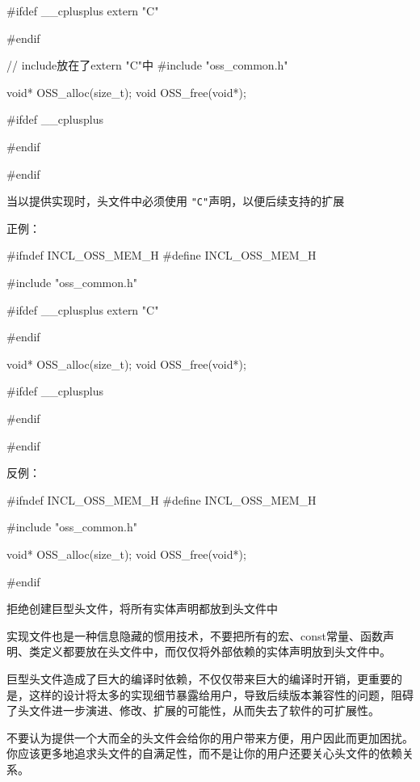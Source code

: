 \begin{content}
\begin{leftbar}
\begin{c++}
#ifdef  __cplusplus
extern "C" {
#endif

// include放在了extern "C"中
#include "oss_common.h"

void* OSS_alloc(size_t);
void  OSS_free(void*);

#ifdef  __cplusplus
}
#endif

#endif
\end{c++}
\end{leftbar}

\begin{regulation}
当以\clang{}提供实现时，头文件中必须使用 \texttt{"C"}声明，以便后续支持\cpp{}的扩展
\end{regulation}

正例：
\begin{leftbar}
\begin{c++}
#ifndef INCL_OSS_MEM_H
#define INCL_OSS_MEM_H

#include "oss_common.h"

#ifdef  __cplusplus
extern "C" {
#endif

void* OSS_alloc(size_t);
void  OSS_free(void*);

#ifdef  __cplusplus
}
#endif

#endif
\end{c++}
\end{leftbar}

反例：
\begin{leftbar}
\begin{c++}
#ifndef INCL_OSS_MEM_H
#define INCL_OSS_MEM_H

#include "oss_common.h"

void* OSS_alloc(size_t);
void  OSS_free(void*);

#endif
\end{c++}
\end{leftbar}

\begin{advise}
拒绝创建巨型头文件，将所有实体声明都放到头文件中
\end{advise}

实现文件也是一种信息隐藏的惯用技术，不要把所有的宏、const常量、函数声明、类定义都要放在头文件中，而仅仅将外部依赖的实体声明放到头文件中。

巨型头文件造成了巨大的编译时依赖，不仅仅带来巨大的编译时开销，更重要的是，这样的设计将太多的实现细节暴露给用户，导致后续版本兼容性的问题，阻碍了头文件进一步演进、修改、扩展的可能性，从而失去了软件的可扩展性。

不要认为提供一个大而全的头文件会给你的用户带来方便，用户因此而更加困扰。你应该更多地追求头文件的自满足性，而不是让你的用户还要关心头文件的依赖关系。

\end{content}

